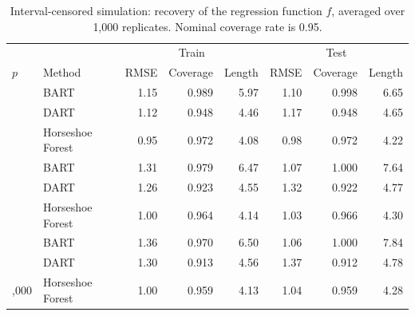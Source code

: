 \begin{table}[!h]
\centering
\caption{Interval-censored simulation: recovery of the regression function $f$,
     averaged over 1,000 replicates. Nominal coverage rate is 0.95.}
\centering
\begin{tabular}[t]{llrrrrrr}
\toprule
\multicolumn{2}{c}{ } & \multicolumn{3}{c}{Train} & \multicolumn{3}{c}{Test} \\
\cmidrule(l{3pt}r{3pt}){3-5} \cmidrule(l{3pt}r{3pt}){6-8}
$p$ & Method & RMSE & Coverage & Length & RMSE & Coverage & Length\\
\midrule
 & BART & 1.15 & 0.989 & 5.97 & 1.10 & 0.998 & 6.65\\

 & DART & 1.12 & 0.948 & 4.46 & 1.17 & 0.948 & 4.65\\

\multirow{-3}{*}{\raggedright\arraybackslash 50} & Horseshoe Forest & 0.95 & 0.972 & 4.08 & 0.98 & 0.972 & 4.22\\
\cmidrule{1-8}
 & BART & 1.31 & 0.979 & 6.47 & 1.07 & 1.000 & 7.64\\

 & DART & 1.26 & 0.923 & 4.55 & 1.32 & 0.922 & 4.77\\

\multirow{-3}{*}{\raggedright\arraybackslash 500} & Horseshoe Forest & 1.00 & 0.964 & 4.14 & 1.03 & 0.966 & 4.30\\
\cmidrule{1-8}
 & BART & 1.36 & 0.970 & 6.50 & 1.06 & 1.000 & 7.84\\

 & DART & 1.30 & 0.913 & 4.56 & 1.37 & 0.912 & 4.78\\

\multirow{-3}{*}{\raggedright\arraybackslash 5,000} & Horseshoe Forest & 1.00 & 0.959 & 4.13 & 1.04 & 0.959 & 4.28\\
\bottomrule
\end{tabular}
\end{table}
